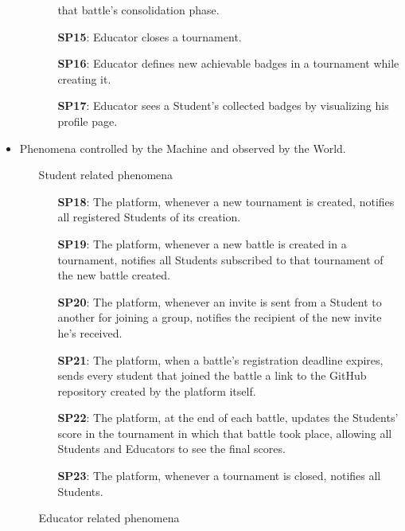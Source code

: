 \documentclass{article}
\begin{document}
\begin{itemize}
\begin{enumerate}
\begin{enumerate}
                         that battle's consolidation phase.
                        \item[\textbf{SP15}:] Educator closes a tournament.
                        \item[\textbf{SP16}:] Educator defines new achievable badges in a tournament while creating it.
                        \item[\textbf{SP17}:] Educator sees a Student's collected badges by visualizing his profile page.
                    \end{enumerate}
          \end{enumerate}

    \item Phenomena controlled by the Machine and observed by the World.
          \begin{enumerate}
              \item[\ding{228}] Student related phenomena
                    \begin{enumerate}
                        \item[\textbf{SP18}:] The platform, whenever a new tournament is created, notifies all registered Students of its creation.
                        \item[\textbf{SP19}:] The platform, whenever a new battle is created in a tournament, notifies all Students subscribed to that 
                        tournament of the new battle created.
                        \item[\textbf{SP20}:] The platform, whenever an invite is sent from a Student to another for joining a group, notifies the recipient 
                        of the new invite he's received.
                        \item[\textbf{SP21}:] The platform, when a battle's registration deadline expires, sends every student that
                         joined the battle a link to the GitHub repository created by the platform itself.
                        \item[\textbf{SP22}:] The platform, at the end of each battle, updates the Students' score in the tournament in
                         which that battle took place, allowing all Students and Educators to see the final scores.
                        \item[\textbf{SP23}:] The platform, whenever a tournament is closed, notifies all Students.
                    \end{enumerate}
              \item[\ding{228}] Educator related phenomena

\end{enumerate}
\end{itemize}
\end{document}
